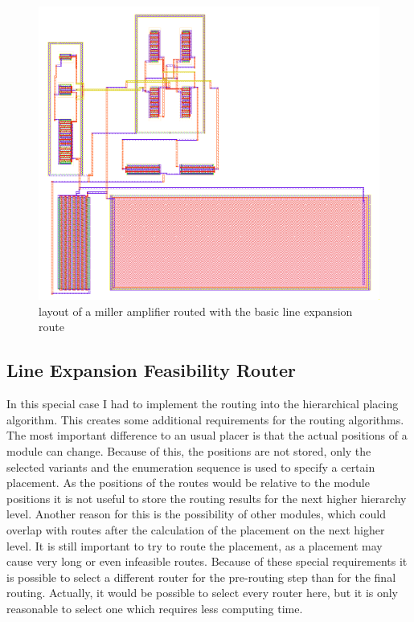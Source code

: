 \begin{figure}
	\centering
	\includegraphics[scale=.6]{FIG/miller_amplifier_routed_basic_line_expansion_2.png}
  	\caption{layout of a miller amplifier routed with the basic line expansion route}
	\label{fig:miller_amplifier_routed_basic_line_expansion_2}
\end{figure}	

\subsection{Line Expansion Feasibility Router}
In this special case I had to implement the routing into the hierarchical placing algorithm. This creates some additional requirements for the routing algorithms. The most important difference to an usual placer is that the actual positions of a module can change. Because of this, the positions are not stored, only the selected variants and the enumeration sequence is used to specify a certain placement. As the positions of the routes would be relative to the module positions it is not useful to store the routing results for the next higher hierarchy level. Another reason for this is the possibility of other modules, which could overlap with routes after the calculation of the placement on the next higher level. It is still important to try to route the placement, as a placement may cause very long or even infeasible routes. Because of these special requirements it is possible to select a different router for the pre-routing step than for the final routing. Actually, it would be possible to select every router here, but it is only reasonable to select one which requires less computing time.

